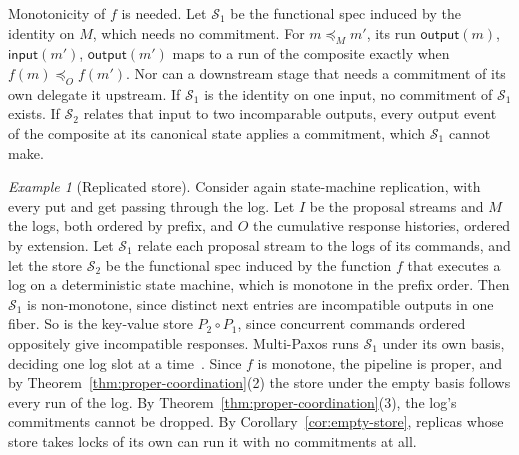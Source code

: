 \documentclass[sigconf]{cidr-2027}
\theoremstyle{remark}
\newtheorem{example}{Example}
\newcommand{\OutputOrd}{\preceq_O}
\newcommand{\commitment}{commitment\xspace}
\newcommand{\commitments}{commitments\xspace}
\newcommand{\Spec}{\mathcal{S}}
\begin{document}
\color{blue!70!black}Monotonicity of $f$ is needed.  Let $\Spec_1$ be the functional spec
induced by the identity on
$M$, which needs no \commitment.  For $m\preceq_M m'$, its run
$\mathsf{output}(m)$, $\mathsf{input}(m')$, $\mathsf{output}(m')$ maps to a run
of the composite exactly when $f(m)\OutputOrd f(m')$.  Nor can a downstream stage that needs a \commitment of its own delegate it
upstream.  If $\Spec_1$ is the identity on one input, no \commitment of
$\Spec_1$ exists.  If $\Spec_2$ relates that input
to two incomparable outputs, every output event of the composite at its
canonical state applies a \commitment, which $\Spec_1$ cannot make.\color{black}

\color{blue!70!black}\begin{example}[Replicated store]
\label{ex:committed-log-composition}
Consider again state-machine replication, with every put and get passing
through the log.  Let $I$ be the proposal streams and $M$ the logs, both ordered by prefix,
and $O$ the cumulative response histories, ordered by extension.
Let $\Spec_1$ relate each proposal stream to the logs of its commands, and let
the store $\Spec_2$ be the functional spec induced by the function
$f$ that executes a log on a
deterministic state machine, which is monotone in the prefix order.  Then
$\Spec_1$ is non-monotone, since distinct next entries are incompatible
outputs in one fiber.  So is the key-value store $P_2\circ P_1$, since
concurrent commands ordered oppositely give incompatible responses.
Multi-Paxos runs $\Spec_1$ under its own basis, deciding one log slot at a
time~\cite{schneider1990smr,lamport2001paxos}.  Since $f$ is monotone, the
pipeline is proper, and by Theorem~\ref{thm:proper-coordination}(2) the store
under the empty basis follows every run of the log.  By
Theorem~\ref{thm:proper-coordination}(3), the log's \commitments cannot be
dropped.  By Corollary~\ref{cor:empty-store}, replicas whose store takes locks
of its own can run it with no \commitments at all.\color{black}
\end{example}
\end{document}
